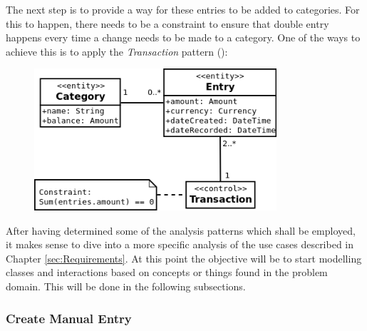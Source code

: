 The next step is to provide a way for these entries to be added to categories.
For this to happen, there needs to be a constraint to ensure that double entry
happens every time a change needs to be made to a category. One of the ways to
achieve this is to apply the \emph{Transaction} pattern
(\cite[][Section~6.2]{fowler1997analysis}):
\begin{figure}[ht!]
  \begin{center}
    \includegraphics[width=9cm]{./contents/img/Class_Diagram_-_Transaction.png}
  \end{center}
  \caption{}
  \label{fig:ClassDiagram.Transaction}
\end{figure}
\FloatBarrier

After having determined some of the analysis patterns which shall be employed,
it makes sense to dive into a more specific analysis of the use cases described
in Chapter \ref{sec:Requirements}. At this point the objective will be to start
modelling classes and interactions based on concepts or things found in the
problem domain. This will be done in the following subsections.

\subsubsection{Create Manual Entry} \label{sec:AnalysisAndDesign.BusinessLogic.ManualEntry}

